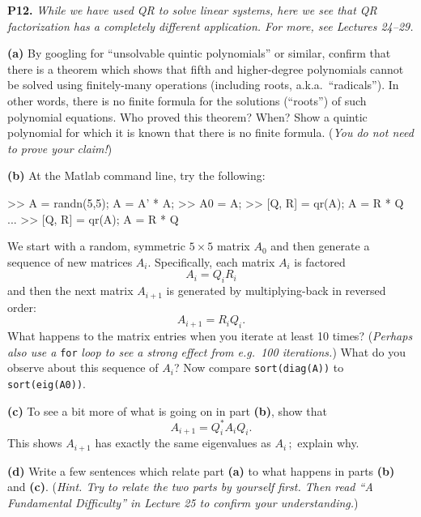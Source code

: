 \documentclass[12pt]{amsart}
\newcommand{\prob}[1]{\bigskip\noindent\textbf{#1.}\quad }
\newcommand{\epart}[1]{\medskip\noindent\textbf{(#1)}\quad }
\begin{document}
\prob{P12}  \emph{While we have used QR to solve linear systems, here we see that QR factorization has a completely different application.  For more, see Lectures 24--29.}

\epart{a} By googling for ``unsolvable quintic polynomials'' or similar, confirm that there is a theorem which shows that fifth and higher-degree polynomials cannot be solved using finitely-many operations (including roots, a.k.a.~``radicals'').  In other words, there is no finite formula for the solutions (``roots'') of such polynomial equations.  Who proved this theorem?  When?  Show a quintic polynomial for which it is known that there is no finite formula.  (\emph{You do \emph{not} need to prove your claim!})

\clearpage\newpage
\epart{b} At the Matlab command line, try the following:
\begin{mVerb}
>> A = randn(5,5);  A = A' * A;    %
>> A0 = A;                         %
>> [Q, R] = qr(A);  A = R * Q
...                                %
>> [Q, R] = qr(A);  A = R * Q
\end{mVerb}
We start with a random, symmetric $5\times 5$ matrix $A_0$ and then generate a sequence of new matrices $A_i$.  Specifically, each matrix $A_i$ is factored
    $$A_i = Q_i R_i$$
and then the next matrix $A_{i+1}$ is generated by multiplying-back in reversed order:
    $$A_{i+1} = R_i Q_i.$$
What happens to the matrix entries when you iterate at least 10 times?  (\emph{Perhaps also use a} \texttt{for} \emph{loop to see a strong effect from e.g.~100 iterations.})  What do you observe about this sequence of $A_i$?  Now compare \verb|sort(diag(A))| to \verb|sort(eig(A0))|.

\epart{c} To see a bit more of what is going on in part \textbf{(b)}, show that
    $$A_{i+1} = Q_i^* A_i Q_i.$$
This shows $A_{i+1}$ has exactly the same eigenvalues as $A_i$\,; \,explain why.

\epart{d} Write a few sentences which relate part \textbf{(a)} to what happens in parts \textbf{(b)} and \textbf{(c)}.  (\emph{Hint.  Try to relate the two parts by yourself first.  Then read ``A Fundamental Difficulty'' in Lecture 25 to confirm your understanding.})
\end{document}
